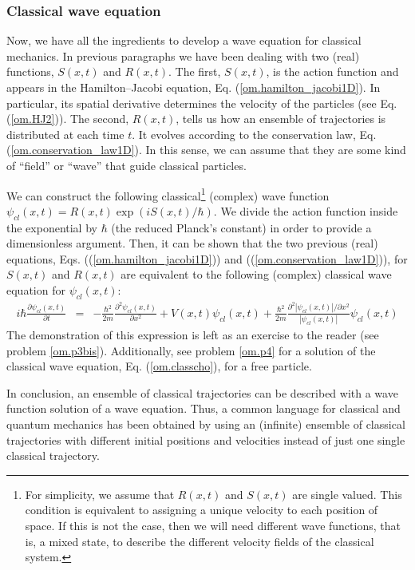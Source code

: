 \documentclass[onecolumn,nofootinbib, secnumarabic, amsmath, nobibnotes,11pt,aps,pra]{revtex4-1}
\newcommand{\pref}[1]{(\ref{#1})}
\newcommand{\eref}[1]{Eq. (\ref{#1})}
\begin{document}
\subsubsection{Classical wave equation}

Now, we have all the ingredients to develop a wave equation for classical mechanics. In previous paragraphs we have been dealing with two (real) functions, $S(x,t)$ and $R(x,t)$. The first, $S(x,t)$, is the action function and appears in the Hamilton--Jacobi equation, \eref{om.hamilton_jacobi1D}. In particular, its spatial derivative determines the velocity of the particles (see \eref{om.HJ2}). The second, $R(x,t)$, tells us how an ensemble of trajectories is distributed at each time $t$. It evolves according to the conservation law, \eref{om.conservation_law1D}. In this sense, we can assume that they are some kind of ``field'' or ``wave'' that guide classical particles.

We can construct the following classical\footnote{For simplicity, we assume that $R(x,t)$ and $S(x,t)$ are single valued. This condition is equivalent to assigning a unique velocity to each position of space. If this is not the case, then we will need different wave functions, that is, a mixed state, to describe the different velocity fields of the classical system.} (complex) wave function $\psi_{cl}(x,t) = R(x,t) \exp(i S(x,t)/\hbar)$.
We divide the action function inside the exponential by $\hbar$ (the reduced Planck's constant) in order to provide a dimensionless argument.
Then, it can be shown that the two previous (real) equations, Eqs. (\pref{om.hamilton_jacobi1D}) and (\pref{om.conservation_law1D}), for $S(x,t)$ and $R(x,t)$ are equivalent to the following (complex) classical wave equation for $\psi_{cl}(x,t)$:
\begin{eqnarray}
\label{om.classcho}
i \hbar \frac{ \partial \psi_{cl}(x,t)} {\partial t} &=& -\frac {\hbar^2}{2m} \frac{ {\partial}^2 \psi_{cl}(x,t)} {\partial x^2} + V(x,t) \psi_{cl}(x,t)+ \frac {\hbar^{2}} {2 m} \frac { {\partial}^2 |\psi_{cl}(x,t)|/ \partial x^2}{|\psi_{cl}(x,t)|} \psi_{cl}(x,t)
\end{eqnarray}
The demonstration of this expression is left as an exercise to the
reader (see problem \ref{om.p3bis}). Additionally, see problem
\ref{om.p4} for a solution of the classical wave equation,
\eref{om.classcho}, for a free particle.

In conclusion, an ensemble of classical trajectories can be described with a wave function solution of a wave equation.
Thus, a common language for classical and quantum mechanics has been obtained by using an (infinite) ensemble of classical trajectories with different initial positions and velocities instead of just one single classical trajectory.
\end{document}
